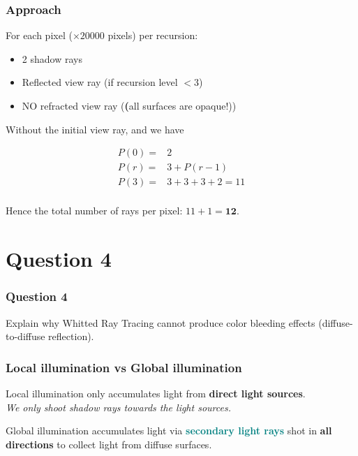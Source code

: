\documentclass{beamer}
\begin{document}
\begin{frame}
    \frametitle{Approach}

    For each pixel ($\times 20000$ pixels) per recursion:

    \begin{itemize}
        \item 2 shadow rays
        \item Reflected view ray (if recursion level $<3$)
        \item NO refracted view ray (\textbf(all surfaces are opaque!))
    \end{itemize}

    Without the initial view ray, and we have

    \begin{eqnarray*}
        P(0) =& 2\\
        P(r) =& 3 + P(r-1)\\
        P(3) =& 3 + 3 + 3 + 2 = 11\\
    \end{eqnarray*}

    Hence the total number of rays per pixel: $11 + 1 = \mathbf{12}$.

\end{frame}

\section{Question 4}

\begin{frame}
    \frametitle{Question 4}
    Explain why Whitted Ray Tracing cannot produce color bleeding effects 
    (diffuse-to-diffuse reflection).
\end{frame}

\begin{frame}
    \frametitle{Local illumination vs Global illumination}

    Local illumination only accumulates light from \textbf{direct light sources}.\\
    \textit{We only shoot shadow rays towards the light sources.}

    \vspace{1em}

    Global illumination accumulates light via \textcolor{teal}{\textbf{secondary light rays}}
    shot in \textbf{all directions} to collect light from diffuse surfaces.

\end{frame}
\end{document}
